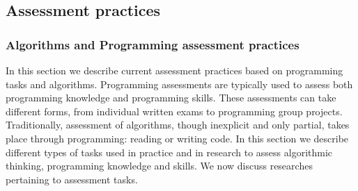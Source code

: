  





\subsection{Assessment practices}



\subsubsection{Algorithms and Programming assessment practices}\label{sec:progAssessPractices}

In this section we describe current assessment practices based on programming tasks and algorithms. Programming assessments are typically used to assess both programming knowledge and programming skills.
These assessments can take different forms, from individual written exams to programming group projects.  Traditionally, assessment of algorithms, though inexplicit and only partial, takes place through programming: reading or writing code. In this section we describe different types of tasks used in practice and in research to assess algorithmic thinking, programming knowledge and skills. We now discuss researches pertaining to assessment tasks.








